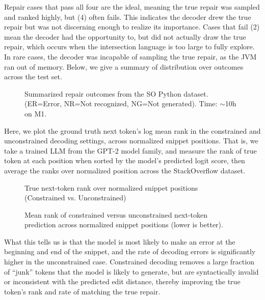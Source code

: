 \noindent Repair cases that pass all four are the ideal, meaning the true repair was sampled and ranked highly, but (4) often fails. This indicates the decoder drew the true repair but was not discerning enough to realize its importance. Cases that fail (2) mean the decoder had the opportunity to, but did not actually draw the true repair, which occurs when the intersection language is too large to fully explore. In rare cases, the decoder was incapable of sampling the true repair, as the JVM ran out of memory. Below, we give a summary of distribution over outcomes across the test set.

\begin{figure}[H]
\begin{center}
\resizebox{.73\textwidth}{!}{}
\caption{Summarized repair outcomes from the SO Python dataset. (ER=Error, NR=Not recognized, NG=Not generated). Time: $\sim$10h on M1.}
\end{center}
\end{figure}

Here, we plot the ground truth next token's log mean rank in the constrained and unconstrained decoding settings, across normalized snippet positions. That is, we take a trained LLM from the GPT-2 model family, and measure the rank of true token at each position when sorted by the model's predicted logit score, then average the ranks over normalized position across the StackOverflow dataset.

\begin{figure}[h]
  \begin{center}
    \footnotesize{True next-token rank over normalized snippet positions (Constrained vs. Unconstrained)}
    \resizebox{.83\textwidth}{!}{}\vspace{-0.2cm}
  \end{center}
  \caption{Mean rank of constrained versus unconstrained next-token prediction across normalized snippet positions (lower is better).}
\end{figure}

What this tells us is that the model is most likely to make an error at the beginning and end of the snippet, and the rate of decoding errors is significantly higher in the unconstrained case. Constrained decoding removes a large fraction of ``junk'' tokens that the model is likely to generate, but are syntactically invalid or inconsistent with the predicted edit distance, thereby improving the true token's rank and rate of matching the true repair.